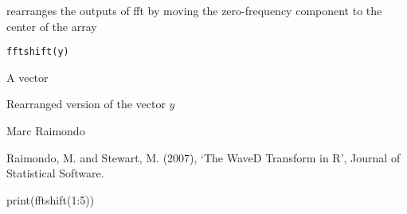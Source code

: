 \begin{Description}\relax
rearranges the outputs of fft by moving 
the zero-frequency component to the center of the array
\end{Description}
\begin{Usage}
\begin{verbatim}
fftshift(y)
\end{verbatim}
\end{Usage}
\begin{Arguments}
\begin{ldescription}
\item[\code{y}] A vector
\end{ldescription}
\end{Arguments}
\begin{Value}
Rearranged version of the vector $y$
\end{Value}
\begin{Author}\relax
Marc Raimondo
\end{Author}
\begin{References}\relax
Raimondo, M. and Stewart, M. (2007),
`The WaveD Transform in R', Journal of Statistical Software.
\end{References}
\begin{SeeAlso}\relax
{}
\end{SeeAlso}
\begin{Examples}
\begin{ExampleCode} print(fftshift(1:5))\end{ExampleCode}
\end{Examples}

